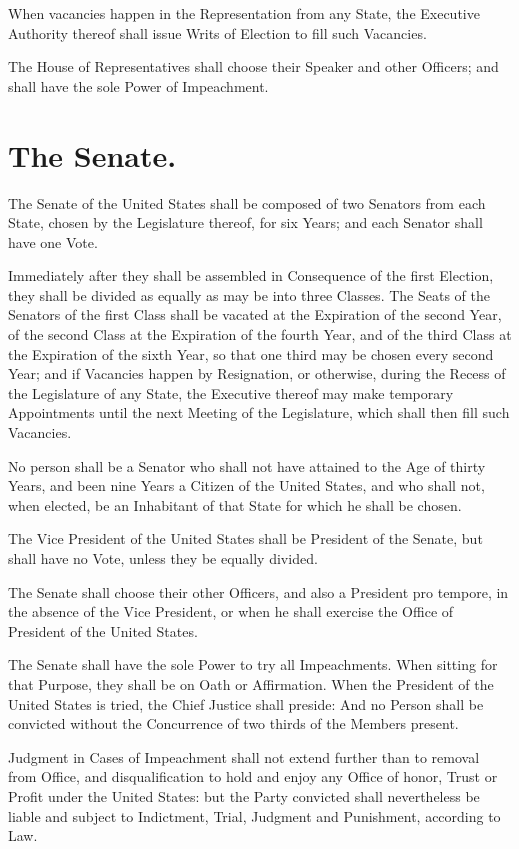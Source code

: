 \documentclass[12pt]{constitution}
\begin{document}
When vacancies happen in the Representation from any State, the Executive
Authority thereof shall issue Writs of Election to fill such Vacancies.

The House of Representatives shall choose their Speaker and other Officers; and
shall have the sole Power of Impeachment.


\section{The Senate.}
The Senate of the United States shall be composed of two Senators from each
State, chosen by the Legislature thereof, for six Years; and each Senator shall
have one Vote.

Immediately after they shall be assembled in Consequence of the first Election,
they shall be divided as equally as may be into three Classes. The Seats of the
Senators of the first Class shall be vacated at the Expiration of the second
Year, of the second Class at the Expiration of the fourth Year, and of the
third Class at the Expiration of the sixth Year, so that one third may be
chosen every second Year; and if Vacancies happen by Resignation, or otherwise,
during the Recess of the Legislature of any State, the Executive thereof may
make temporary Appointments until the next Meeting of the Legislature, which
shall then fill such Vacancies.

No person shall be a Senator who shall not have attained to the Age of thirty
Years, and been nine Years a Citizen of the United States, and who shall not,
when elected, be an Inhabitant of that State for which he shall be chosen.

The Vice President of the United States shall be President of the Senate, but
shall have no Vote, unless they be equally divided.

The Senate shall choose their other Officers, and also a President pro tempore,
in the absence of the Vice President, or when he shall exercise the Office of
President of the United States.

The Senate shall have the sole Power to try all Impeachments. When sitting for
that Purpose, they shall be on Oath or Affirmation. When the President of the
United States is tried, the Chief Justice shall preside: And no Person shall be
convicted without the Concurrence of two thirds of the Members present.

Judgment in Cases of Impeachment shall not extend further than to removal from
Office, and disqualification to hold and enjoy any Office of honor, Trust or
Profit under the United States: but the Party convicted shall nevertheless be
liable and subject to Indictment, Trial, Judgment and Punishment, according to
Law.
\end{document}

